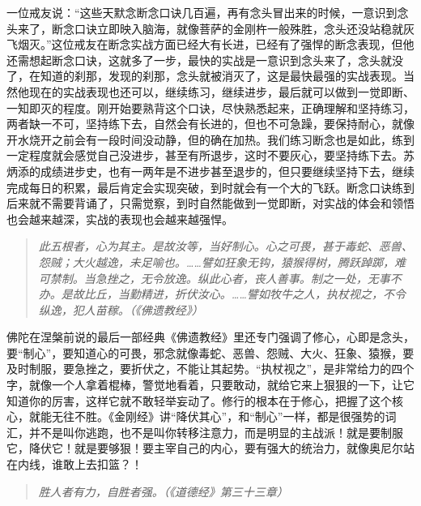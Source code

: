 一位戒友说：“这些天默念断念口诀几百遍，再有念头冒出来的时候，一意识到念头来了，断念口诀立即映入脑海，就像菩萨的金刚杵一般殊胜，念头还没站稳就灰飞烟灭。”这位戒友在断念实战方面已经大有长进，已经有了强悍的断念表现，但他还需想起断念口诀，这就多了一步，最快的实战是一意识到念头来了，念头就没了，在知道的刹那，发现的刹那，念头就被消灭了，这是最快最强的实战表现。当然他现在的实战表现也还可以，继续练习，继续进步，最后就可以做到一觉即断、一知即灭的程度。刚开始要熟背这个口诀，尽快熟悉起来，正确理解和坚持练习，两者缺一不可，坚持练下去，自然会有长进的，但也不可急躁，要保持耐心，就像开水烧开之前会有一段时间没动静，但的确在加热。我们练习断念也是如此，练到一定程度就会感觉自己没进步，甚至有所退步，这时不要灰心，要坚持练下去。苏炳添的成绩进步史，也有一两年是不进步甚至退步的，但只要继续坚持下去，继续完成每日的积累，最后肯定会实现突破，到时就会有一个大的飞跃。断念口诀练到后来就不需要背诵了，只需觉察，到时自然能做到一觉即断，对实战的体会和领悟也会越来越深，实战的表现也会越来越强悍。

\begin{quote}\it
    此五根者，心为其主。是故汝等，当好制心。心之可畏，甚于毒蛇、恶兽、怨贼；大火越逸，未足喻也。……譬如狂象无钩，猿猴得树，腾跃踔踯，难可禁制。当急挫之，无令放逸。纵此心者，丧人善事。制之一处，无事不办。是故比丘，当勤精进，折伏汝心。……譬如牧牛之人，执杖视之，不令纵逸，犯人苗稼。（《佛遗教经》）
\end{quote}

佛陀在涅槃前说的最后一部经典《佛遗教经》里还专门强调了修心，心即是念头，要“制心”，要知道心的可畏，邪念就像毒蛇、恶兽、怨贼、大火、狂象、猿猴，要及时制服，要急挫之，要折伏之，不能让其起势。“执杖视之”，是非常给力的四个字，就像一个人拿着棍棒，警觉地看着，只要敢动，就给它来上狠狠的一下，让它知道你的厉害，这样它就不敢轻举妄动了。修行的根本在于修心，把握了这个核心，就能无往不胜。《金刚经》讲“降伏其心”，和“制心”一样，都是很强势的词汇，并不是叫你逃跑，也不是叫你转移注意力，而是明显的主战派！就是要制服它，降伏它！就是要够狠！要主宰自己的内心，要有强大的统治力，就像奥尼尔站在内线，谁敢上去扣篮？！

\begin{quote}\it
    胜人者有力，自胜者强。（《道德经》第三十三章）
\end{quote}

